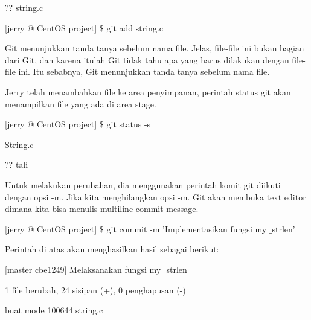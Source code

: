 \noindent 
 \hspace*{0.5in} ?? string.c \par
\noindent 
 \hspace*{0.5in} [jerry @ CentOS project]  $  \$  $ git add string.c \par
 \vspace{\baselineskip}
\noindent 
Git menunjukkan tanda tanya sebelum nama file. Jelas, file-file ini bukan bagian dari Git, dan karena itulah Git tidak tahu apa yang harus dilakukan dengan file-file ini. Itu sebabnya, Git menunjukkan tanda tanya sebelum nama file. \par
\noindent 
Jerry telah menambahkan file ke area penyimpanan, perintah status git akan menampilkan file yang ada di area stage. \par
\vspace{\baselineskip}
\noindent 
 \hspace*{0.5in} [jerry @ CentOS project]  $  \$  $ git status -s \par
\noindent 
 \hspace*{0.5in} String.c \par
\noindent 
 \hspace*{0.5in} ?? tali \par
 \vspace{\baselineskip}
\noindent 
 \hspace*{0.5in} Untuk melakukan perubahan, dia menggunakan perintah komit git diikuti dengan opsi -m. Jika kita menghilangkan opsi -m. Git akan membuka text editor dimana kita bisa menulis multiline commit message. \par
 \vspace{\baselineskip}
\noindent 
 \hspace*{0.5in} [jerry @ CentOS project]  $  \$  $ git commit -m 'Implementasikan fungsi my $  \_  $strlen' \par
\noindent 
 \hspace*{0.5in} Perintah di atas akan menghasilkan hasil sebagai berikut: \par
\noindent 
 \hspace*{0.5in} [master cbe1249] Melaksanakan fungsi my $  \_  $strlen \par
\noindent 
 \hspace*{0.5in} 1 file berubah, 24 sisipan (+), 0 penghapusan (-) \par
\noindent 
 \hspace*{0.5in} buat mode 100644 string.c \par
 \vspace{\baselineskip}
